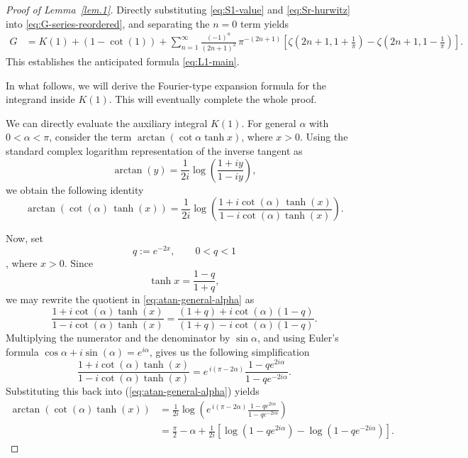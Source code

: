 \documentclass[preprint,12pt,nopreprintline]{elsarticle}
\begin{document}
\begin{proof}[Proof of Lemma~\ref{lem.1}]
Directly substituting \eqref{eq:S1-value} and \eqref{eq:Sr-hurwitz} into \eqref{eq:G-series-reordered}, and separating the $n=0$ term yields
\begin{align}
G
&=
K(1)
+
(1-\cot \left(1\right))
+
\sum_{n=1}^{\infty}
\frac{(-1)^n}{(2n+1)^2}\,
\pi^{-(2n+1)}
\left[
\zeta\!\left(2n+1,1+\frac{1}{\pi}\right)
-
\zeta\!\left(2n+1,1-\frac{1}{\pi}\right)
\right].
\label{eq:G-final-hurwitz}
\end{align}
This establishes the anticipated formula \eqref{eq:L1-main}.

\vspace{0.2cm}
In what follows, we will derive the Fourier-type expansion formula for the integrand inside $K(1)$. This will eventually complete the whole proof. 

We can directly evaluate the auxiliary integral $K(1)$. For general $\alpha$ with $0<\alpha<\pi$, consider the term $\arctan(\cot\alpha \tanh x)$, where $x>0$.
Using the standard complex logarithm representation of the inverse tangent as
\begin{equation}\label{eq:atan-log}
\arctan \left(y\right)
=
\frac{1}{2i}\log\!\left(\frac{1+iy}{1-iy}\right),
\end{equation}
we obtain the following identity
\begin{equation}\label{eq:atan-general-alpha}
\arctan(\cot\left(\alpha\right)\,\tanh \left(x\right))
=
\frac{1}{2i}
\log\!\left(
\frac{1+i\cot\left(\alpha\right)\,\tanh \left
(x\right)}{1-i\cot\left
(\alpha\right)\tanh \left(x\right)
}\right).
\end{equation}

Now, set
\[
q:=e^{-2x},
\qquad 0<q<1\],
where $x>0$. Since
\[
\tanh x=\frac{1-q}{1+q},
\]
we may rewrite the quotient in \eqref{eq:atan-general-alpha} as
\[
\frac{1+i\cot\left(\alpha\right)\tanh \left(x\right)}{1-i\cot\left(\alpha\right)\tanh \left
(x\right)}
=
\frac{(1+q)+i\cot\left(\alpha\right)(1-q)}{(1+q)-i\cot\left(\alpha\right)(1-q)}.
\]
Multiplying the numerator and the denominator by $\sin\alpha$, and using Euler’s formula $\cos\alpha+i\sin\left(\alpha\right)=e^{i\alpha}$, gives us the following simplification
\begin{equation}\label{eq:quotient-simplified}
\frac{1+i\cot\left(\alpha\right)\tanh \left(x\right)}{1-i\cot\left(\alpha\right)\tanh \left(x\right)}
=
e^{\,i(\pi-2\alpha)}
\frac{1-qe^{2i\alpha}}{1-qe^{-2i\alpha}}.
\end{equation}
Substituting this back into (\ref{eq:atan-general-alpha}) yields
\begin{align}
\arctan\left(\cot\left(\alpha\right)\tanh \left(x\right)\right)
&=
\frac{1}{2i}\log\!\left(
e^{\,i(\pi-2\alpha)}
\frac{1-qe^{2i\alpha}}{1-qe^{-2i\alpha}}
\right)
\nonumber\\
&=
\frac{\pi}{2}-\alpha
+
\frac{1}{2i}
\left[
\log(1-qe^{2i\alpha})-\log(1-qe^{-2i\alpha})
\right].
\label{eq:atan-alpha-expanded}
\end{align}


\end{proof}
\end{document}
